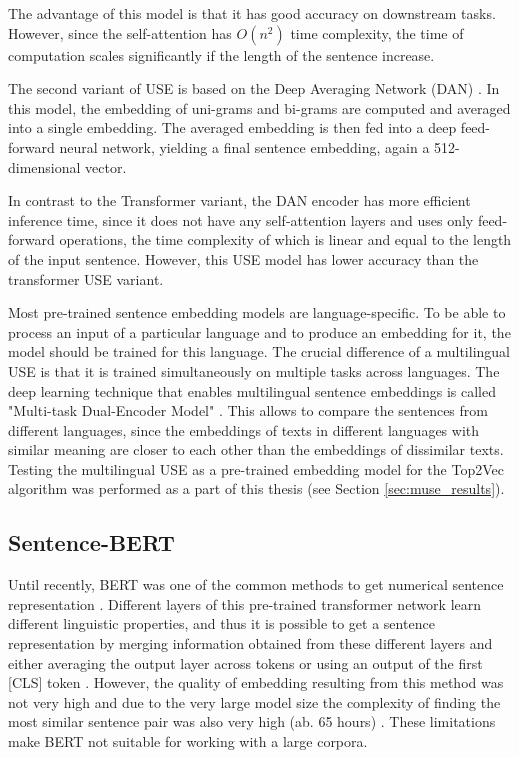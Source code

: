 \documentclass[fontsize=12pt,a4paper,twoside,openany]{scrbook}
\begin{document}
The advantage of this model is that it has good accuracy on downstream tasks. However, since the self-attention has \(O(n^2)\) time complexity, the time of computation scales significantly if the length of the sentence increase.

The second variant of USE is based on the Deep Averaging Network (DAN) \parencite{Iyyer15}. In this model, the embedding of uni-grams and bi-grams are computed and averaged into a single embedding. The averaged embedding is then fed into a deep feed-forward neural network, yielding a final sentence embedding, again a 512-dimensional vector.

In contrast to the Transformer variant, the DAN encoder has more efficient inference time, since it does not have any self-attention layers and uses only feed-forward operations, the time complexity of which is linear and equal to the length of the input sentence. However, this USE model has lower accuracy than the transformer USE variant. 

Most pre-trained sentence embedding models are language-specific. To be able to process an input of a particular language and to produce an embedding for it, the model should be trained for this language. The crucial difference of a multilingual USE is that it is trained simultaneously on multiple tasks across languages. The deep learning technique that enables multilingual sentence embeddings is called "Multi-task Dual-Encoder Model" \parencite{Chidambaram19}. This allows to compare the sentences from different languages, since the embeddings of texts in different languages with similar meaning are closer to each other than the embeddings of dissimilar texts. 
Testing the multilingual USE as a pre-trained embedding model for the Top2Vec algorithm was performed as a part of this thesis (see Section \ref{sec:muse_results}).

\subsection{Sentence-BERT}
\label{sec:sbert}

Until recently, BERT was one of the common methods to get numerical sentence representation \parencite{Devlin19}. Different layers of this pre-trained transformer network learn different linguistic properties, and thus it is possible to get a sentence representation by merging information obtained from these different layers and either averaging the output layer across tokens or using an output of the first [CLS] token \parencite{Wang20}. However, the quality of embedding resulting from this method was not very high and due to the very large model size the complexity of finding the most similar sentence pair was also very high (ab. 65 hours) \parencite{Reimers19}. These limitations make BERT not suitable for working with a large corpora.
\end{document}
